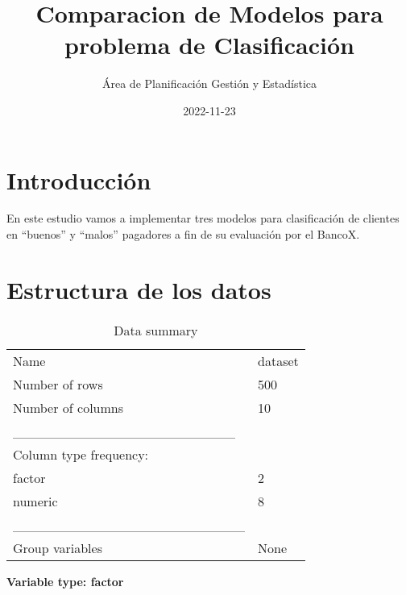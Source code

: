 \documentclass[
]{article}
\title{Comparacion de Modelos para problema de Clasificación}
\author{Área de Planificación Gestión y Estadística}
\date{2022-11-23}
\begin{document}
\maketitle

\hypertarget{introducciuxf3n}{%
\section{Introducción}\label{introducciuxf3n}}

En este estudio vamos a implementar tres modelos para clasificación de
clientes en ``buenos'' y ``malos'' pagadores a fin de su evaluación por
el BancoX.

\hypertarget{estructura-de-los-datos}{%
\section{Estructura de los datos}\label{estructura-de-los-datos}}

\begin{longtable}[]{@{}ll@{}}
\caption{Data summary}\tabularnewline
\toprule()
\endhead
Name & dataset \\
Number of rows & 500 \\
Number of columns & 10 \\
\_\_\_\_\_\_\_\_\_\_\_\_\_\_\_\_\_\_\_\_\_\_\_ & \\
Column type frequency: & \\
factor & 2 \\
numeric & 8 \\
\_\_\_\_\_\_\_\_\_\_\_\_\_\_\_\_\_\_\_\_\_\_\_\_ & \\
Group variables & None \\
\bottomrule()
\end{longtable}

\textbf{Variable type: factor}
\end{document}
